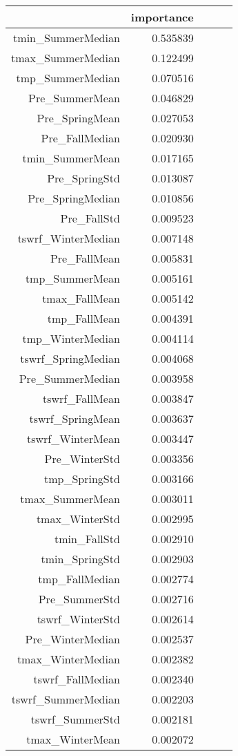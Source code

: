 \begin{tabular}{rrrrr}
\toprule
 & importance \\
\midrule
tmin_SummerMedian & 0.535839 \\
tmax_SummerMedian & 0.122499 \\
tmp_SummerMedian & 0.070516 \\
Pre_SummerMean & 0.046829 \\
Pre_SpringMean & 0.027053 \\
Pre_FallMedian & 0.020930 \\
tmin_SummerMean & 0.017165 \\
Pre_SpringStd & 0.013087 \\
Pre_SpringMedian & 0.010856 \\
Pre_FallStd & 0.009523 \\
tswrf_WinterMedian & 0.007148 \\
Pre_FallMean & 0.005831 \\
tmp_SummerMean & 0.005161 \\
tmax_FallMean & 0.005142 \\
tmp_FallMean & 0.004391 \\
tmp_WinterMedian & 0.004114 \\
tswrf_SpringMedian & 0.004068 \\
Pre_SummerMedian & 0.003958 \\
tswrf_FallMean & 0.003847 \\
tswrf_SpringMean & 0.003637 \\
tswrf_WinterMean & 0.003447 \\
Pre_WinterStd & 0.003356 \\
tmp_SpringStd & 0.003166 \\
tmax_SummerMean & 0.003011 \\
tmax_WinterStd & 0.002995 \\
tmin_FallStd & 0.002910 \\
tmin_SpringStd & 0.002903 \\
tmp_FallMedian & 0.002774 \\
Pre_SummerStd & 0.002716 \\
tswrf_WinterStd & 0.002614 \\
Pre_WinterMedian & 0.002537 \\
tmax_WinterMedian & 0.002382 \\
tswrf_FallMedian & 0.002340 \\
tswrf_SummerMedian & 0.002203 \\
tswrf_SummerStd & 0.002181 \\
tmax_WinterMean & 0.002072 \\

\end{tabular}
